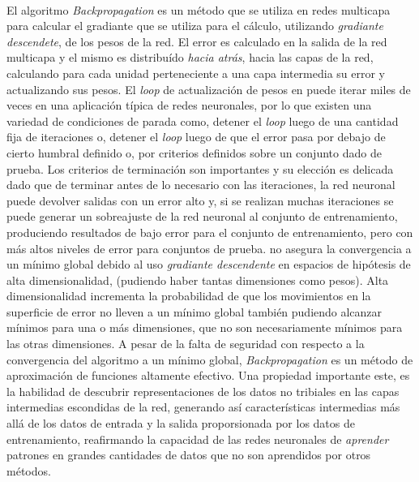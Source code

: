 \paragraph{}El algoritmo \textit{Backpropagation} es un método que se utiliza en redes multicapa para calcular el gradiante que se utiliza para el cálculo, utilizando \textit{gradiante descendete}, de los pesos de la red. El error es calculado en la salida de la red multicapa y el mismo es distribuído \textit{hacia atrás}, hacia las capas de la red, calculando para cada unidad perteneciente a una capa intermedia su error y actualizando sus pesos. El \textit{loop} de actualización de pesos en  puede iterar miles de veces en una aplicación típica de redes neuronales, por lo que existen una variedad de condiciones de parada como, detener el \textit{loop} luego de una cantidad fija de iteraciones o, detener el \textit{loop} luego de que el error pasa por debajo de cierto humbral definido o, por criterios definidos sobre un conjunto dado de prueba. Los criterios de terminación son importantes y su elección es delicada dado que de terminar antes de lo necesario con las iteraciones, la red neuronal puede devolver salidas con un error alto y, si se realizan muchas iteraciones se puede generar un sobreajuste de la red neuronal al conjunto de entrenamiento, produciendo resultados de bajo error para el conjunto de entrenamiento, pero con más altos niveles de error para conjuntos de prueba.  no asegura la convergencia a un mínimo global debido al uso \textit{gradiante descendente} en espacios de hipótesis de alta dimensionalidad, (pudiendo haber tantas dimensiones como pesos). Alta dimensionalidad incrementa la probabilidad de que los movimientos en la superficie de error no lleven a un mínimo global también pudiendo alcanzar mínimos para una o más dimensiones, que no son necesariamente mínimos para las otras dimensiones. A pesar de la falta de seguridad con respecto a la convergencia del algoritmo a un mínimo global, \textit{Backpropagation} es un método de aproximación de funciones altamente efectivo. Una propiedad importante este, es la habilidad de descubrir representaciones de los datos no tribiales en las capas intermedias escondidas de la red, generando así características intermedias más allá de los datos de entrada y la salida proporsionada por los datos de entrenamiento, reafirmando la capacidad de las redes neuronales de \textit{aprender} patrones en grandes cantidades de datos que no son aprendidos por otros métodos. 

